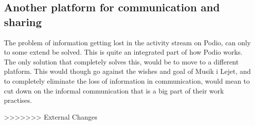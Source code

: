 \subsection{Another platform for communication and sharing}
The problem of information getting lost in the activity stream on Podio, can only to some extend be solved. This is quite an integrated part of how Podio works. The only solution that completely solves this, would be to move to a different platform. This would though go against the wishes and goal of Musik i Lejet, and to completely eliminate the loss of information in communication, would mean to cut down on the informal communication that is a big part of their work practises.

>>>>>>> External Changes
